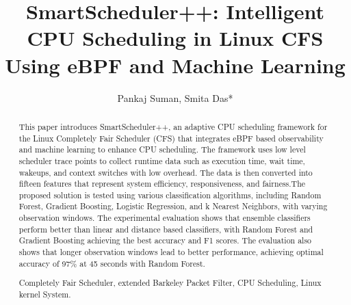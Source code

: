 \documentclass{llncs}
\begin{document}
\title{SmartScheduler++: Intelligent CPU Scheduling in Linux CFS Using eBPF and Machine Learning}

\author{Pankaj Suman, Smita Das*}

\maketitle

\begin{abstract}


This paper introduces SmartScheduler++, an adaptive CPU scheduling framework for the Linux Completely Fair Scheduler (CFS) that integrates eBPF based observability and machine learning to enhance CPU scheduling. The framework uses low level scheduler trace points to collect runtime data such as execution time, wait time, wakeups, and context switches with low overhead. The data is then converted into fifteen features that represent system efficiency, responsiveness, and fairness.The proposed solution is tested using various classification algorithms, including Random Forest, Gradient Boosting, Logistic Regression, and k Nearest Neighbors, with varying observation windows. The experimental evaluation shows that ensemble classifiers perform better than linear and distance based classifiers, with Random Forest and Gradient Boosting achieving the best accuracy and F1 scores. The evaluation also shows that longer observation windows lead to better performance, achieving optimal accuracy of 97\% at 45 seconds with Random Forest. 

\begin{keywords}
Completely Fair Scheduler, extended Barkeley Packet Filter, CPU Scheduling, Linux kernel System.
  \end{keywords}
\end{abstract}
\end{document}

